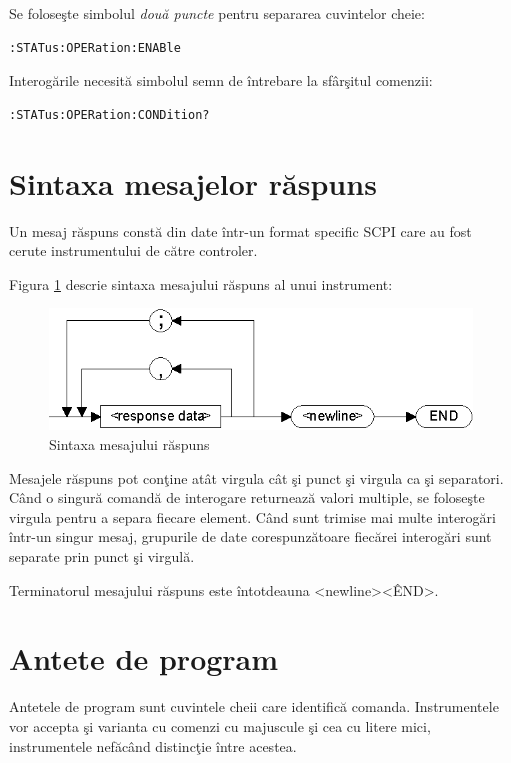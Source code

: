 Se folose\c{s}te simbolul \emph{dou\u{a} puncte} pentru separarea cuvintelor cheie:
\begin{verbatim}
:STATus:OPERation:ENABle
\end{verbatim}

Interog\u{a}rile necesit\u{a} simbolul semn de \^{i}ntrebare la sf\^{a}r\c{s}itul comenzii:
\begin{verbatim}
:STATus:OPERation:CONDition?
\end{verbatim}

\section{Sintaxa mesajelor r\u{a}spuns}
Un mesaj r\u{a}spuns const\u{a} din date \^{i}ntr-un format specific SCPI care au fost cerute instrumentului de c\u{a}tre controler.

Figura \ref{fig4} descrie sintaxa mesajului r\u{a}spuns al unui instrument:

\begin{figure}[htp]
 \centering
 \includegraphics[scale=1]{Figuri/fig4_scpi_meas.eps}
 \caption{Sintaxa mesajului r\u{a}spuns}
 \label{fig4}
\end{figure}

Mesajele r\u{a}spuns pot con\c{t}ine at\^{a}t virgula c\^{a}t \c{s}i punct \c{s}i virgula ca \c{s}i separatori. C\^{a}nd o singur\u{a} comand\u{a} de interogare returneaz\u{a} valori multiple, se folose\c{s}te virgula pentru a separa fiecare element. C\^{a}nd sunt trimise mai multe interog\u{a}ri \^{i}ntr-un singur mesaj, grupurile de date corespunz\u{a}toare fiec\u{a}rei interog\u{a}ri sunt separate prin punct \c{s}i virgul\u{a}.

Terminatorul mesajului r\u{a}spuns este \^{i}ntotdeauna \textless  newline\textgreater\textless \^END\textgreater.

\section{Antete de program}
Antetele de program sunt cuvintele cheii care identific\u{a} comanda. Instrumentele vor accepta \c{s}i varianta cu comenzi cu majuscule \c{s}i cea cu litere mici, instrumentele nef\u{a}c\^{a}nd distinc\c{t}ie \^{i}ntre acestea.

